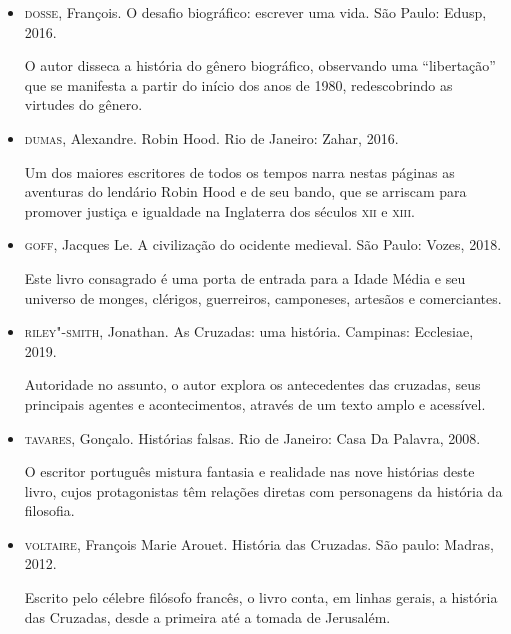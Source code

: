 \documentclass[12pt]{extarticle}
\begin{document}
\begin{itemize}

\item \textsc{dosse}, François. O desafio biográfico: escrever uma vida. São
Paulo: Edusp, 2016.

O autor disseca a história do gênero biográfico, observando uma
``libertação'' que se manifesta a partir do início dos anos de 1980,
redescobrindo as virtudes do gênero.

\item \textsc{dumas}, Alexandre. Robin Hood. Rio de Janeiro: Zahar, 2016.

Um dos maiores escritores de todos os tempos narra nestas páginas as
aventuras do lendário Robin Hood e de seu bando, que se arriscam para
promover justiça e igualdade na Inglaterra dos séculos \textsc{xii} e \textsc{xiii}.

\item \textsc{goff}, Jacques Le. A civilização do ocidente medieval. São Paulo:
Vozes, 2018.

Este livro consagrado é uma porta de entrada para a Idade Média e seu
universo de monges, clérigos, guerreiros, camponeses, artesãos e
comerciantes.

\item \textsc{riley"-smith}, Jonathan. As Cruzadas: uma história. Campinas:
Ecclesiae, 2019.

Autoridade no assunto, o autor explora os antecedentes das cruzadas,
seus principais agentes e acontecimentos, através de um texto amplo e
acessível.

\item \textsc{tavares}, Gonçalo. Histórias falsas. Rio de Janeiro: Casa Da
Palavra, 2008.

O escritor português mistura fantasia e realidade nas nove histórias
deste livro, cujos protagonistas têm relações diretas com personagens da
história da filosofia.

\item \textsc{voltaire}, François Marie Arouet. História das Cruzadas. São paulo: Madras, 2012.

Escrito pelo célebre filósofo francês, o livro conta, em linhas gerais,
a história das Cruzadas, desde a primeira até a tomada de Jerusalém.

\end{itemize}
\end{document}
